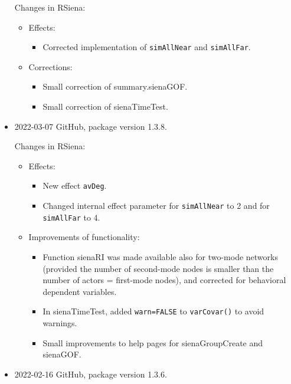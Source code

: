 \documentclass[a4paper,fleqn,11pt]{article}
\newcommand{\+}{\, + \,}
\newcommand{\sfn}[1]{\textsf{#1}}
\begin{document}
\begin{small}
\begin{itemize}
Changes in RSiena:
\begin{itemize}
\item  Effects:
\begin{itemize}
  \item Corrected implementation of \texttt{simAllNear} and
    \texttt{simAllFar}.
\end{itemize}
\item Corrections:
\begin{itemize}
   \item  Small correction of \sfn{summary.sienaGOF}.
   \item  Small correction of \sfn{sienaTimeTest}.
\end{itemize}

\end{itemize}



\item 2022-03-07 GitHub, package version 1.3.8.

Changes in RSiena:
\begin{itemize}
\item  Effects:
\begin{itemize}
  \item New effect  \texttt{avDeg}.
  \item Changed internal effect parameter for \texttt{simAllNear} to 2 and for
    \texttt{simAllFar} to 4.
\end{itemize}
\item Improvements of functionality:
\begin{itemize}
   \item Function \sfn{sienaRI} was made available also for two-mode networks
     (provided the number of second-mode nodes is smaller than the
	 number of actors = first-mode nodes), and corrected
	 for behavioral dependent variables.
  \item In \sfn{sienaTimeTest}, added \texttt{warn=FALSE} to
      \texttt{varCovar()} to avoid warnings.
  \item Small improvements to help pages for \sfn{sienaGroupCreate} and
  \sfn{sienaGOF}.

\end{itemize}

\end{itemize}


\item 2022-02-16 GitHub, package version 1.3.6.


\end{itemize}
\end{small}
\end{document}
